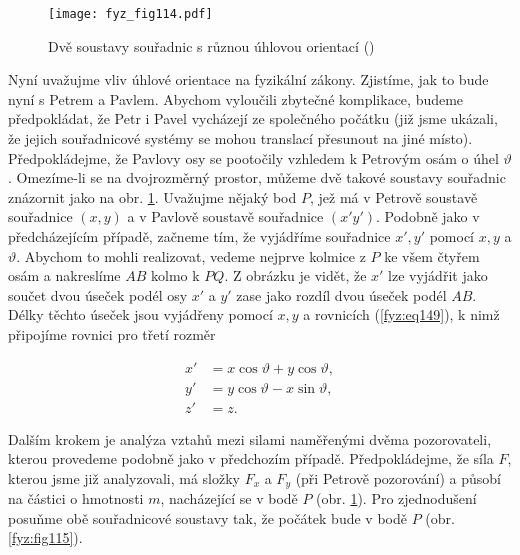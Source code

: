     \begin{figure}[ht!]  %
      \centering
      \texttt{[image: fyz\_fig114.pdf]}
      \caption{Dvě soustavy souřadnic s různou úhlovou orientací
              (\cite[s.~156]{Feynman01})}
      \label{fyz:fig114}
    \end{figure}
    Nyní uvažujme vliv úhlové orientace na fyzikální zákony. Zjistíme, jak to bude nyní s Petrem a 
    Pavlem. Abychom vyloučili zbytečné komplikace, budeme předpokládat, že Petr i Pavel vycházejí 
    ze společného počátku (již jsme ukázali, že jejich souřadnicové systémy se mohou translací 
    přesunout na jiné místo). Předpokládejme, že Pavlovy osy se pootočily vzhledem k Petrovým osám 
    o úhel \(\vartheta\). Omezíme-li se na dvojrozměrný prostor, můžeme dvě takové soustavy 
    souřadnic znázornit jako na obr. \ref{fyz:fig114}. Uvažujme nějaký bod \(P\), jež má v Petrově 
    soustavě souřadnice \((x, y)\) a v Pavlově soustavě souřadnice \((x' y')\). Podobně jako v 
    předcházejícím případě, začneme tím, že vyjádříme souřadnice \(x', y'\) pomocí \(x, y\) a 
    \(\vartheta\). Abychom to mohli realizovat, vedeme nejprve kolmice z \(P\) ke všem čtyřem osám 
    a nakreslíme \(AB\) kolmo k \(PQ\). Z obrázku je vidět, že \(x'\) lze vyjádřit jako součet dvou 
    úseček podél osy \(x'\) a \(y'\) zase jako rozdíl dvou úseček podél \(AB\). Délky těchto úseček 
    jsou vyjádřeny pomocí \(x, y\) a rovnicích (\ref{fyz:eq149}), k nimž připojíme rovnici pro 
    třetí rozměr

    \begin{subequations}\label{fyz:eq149}
      \begin{align}
        x' &= x\cos\vartheta + y\cos\vartheta, \label{fyz:eq149a} \\
        y' &= y\cos\vartheta - x\sin\vartheta, \label{fyz:eq149b} \\
        z' &= z.
      \end{align}
    \end{subequations}

    Dalším krokem je analýza vztahů mezi silami naměřenými dvěma pozorovateli, kterou provedeme 
    podobně jako v předchozím případě. Předpokládejme, že síla \(F\), kterou jsme již analyzovali, 
    má složky \(F_x\) a \(F_y\) (při Petrově pozorování) a působí na částici o hmotnosti \(m\), 
    nacházející se v bodě \(P\) (obr. \ref{fyz:fig114}). Pro zjednodušení posuňme obě souřadnicové 
    soustavy tak, že počátek bude v bodě \(P\) (obr. \ref{fyz:fig115}).
    
